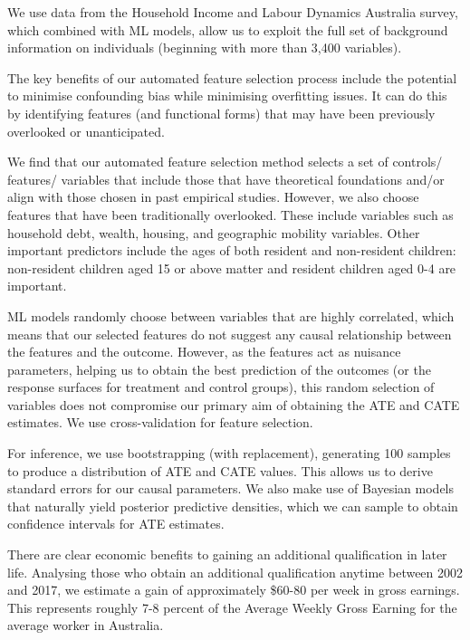 \documentclass[12pt, a4paper]{article}
\begin{document}
We use data from the Household Income and Labour Dynamics Australia survey, which combined with ML models, allow us to exploit the full set of background information on individuals (beginning with more than 3,400 variables).

The key benefits of our automated feature selection process include the potential to minimise confounding bias while minimising overfitting issues. It can do this by identifying features (and functional forms) that may have been previously overlooked or unanticipated.

We find that our automated feature selection method selects a set of controls/ features/ variables that include those that have theoretical foundations and/or align with those chosen in past empirical studies. However, we also choose features that have been traditionally overlooked. These include variables such as household debt, wealth, housing, and geographic mobility variables. Other important predictors include the ages of both resident and non-resident children: non-resident children aged 15 or above matter and resident children aged 0-4 are important.

ML models randomly choose between variables that are highly correlated, which means that our selected features do not suggest any causal relationship between the features and the outcome. However, as the features act as nuisance parameters, helping us to obtain the best prediction of the outcomes (or the response surfaces for treatment and control groups), this random selection of variables does not compromise our primary aim of obtaining the ATE and CATE estimates. We use cross-validation for feature selection.

For inference, we use bootstrapping (with replacement), generating 100 samples to produce a distribution of ATE and CATE values. This allows us to derive standard errors for our causal parameters. We also make use of Bayesian models that naturally yield posterior predictive densities, which we can sample to obtain confidence intervals for ATE estimates.

There are clear economic benefits to gaining an additional qualification in later life. Analysing those who obtain an additional qualification anytime between 2002 and 2017, we estimate a gain of approximately \$60-80 per week in gross earnings. This represents roughly 7-8 percent of the Average Weekly Gross Earning for the average worker in Australia.
\end{document}
